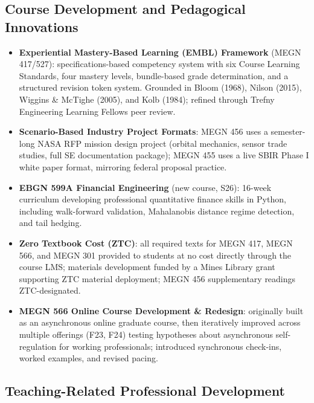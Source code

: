 \documentclass[11pt,letterpaper]{article}
\begin{document}
\subsection{Course Development and Pedagogical Innovations}

\begin{itemize}
  \item \textbf{Experiential Mastery-Based Learning (EMBL) Framework} (MEGN 417/527):
        specifications-based competency system with six Course Learning Standards, four
        mastery levels, bundle-based grade determination, and a structured revision token
        system. Grounded in Bloom (1968), Nilson (2015), Wiggins \& McTighe (2005), and
        Kolb (1984); refined through Trefny Engineering Learning Fellows peer review.

  \item \textbf{Scenario-Based Industry Project Formats}: MEGN 456 uses a semester-long
        NASA RFP mission design project (orbital mechanics, sensor trade studies, full SE
        documentation package); MEGN 455 uses a live SBIR Phase I white paper format,
        mirroring federal proposal practice.

  \item \textbf{EBGN 599A Financial Engineering} (new course, S26): 16-week curriculum
        developing professional quantitative finance skills in Python, including
        walk-forward validation, Mahalanobis distance regime detection, and tail hedging.

  \item \textbf{Zero Textbook Cost (ZTC)}: all required texts for MEGN 417, MEGN 566,
        and MEGN 301 provided to students at no cost directly through the course LMS;
        materials development funded by a Mines Library grant supporting ZTC material
        deployment; MEGN 456 supplementary readings ZTC-designated.

  \item \textbf{MEGN 566 Online Course Development \& Redesign}: originally built as
        an asynchronous online graduate course, then iteratively improved across
        multiple offerings (F23, F24) testing hypotheses about asynchronous
        self-regulation for working professionals; introduced synchronous check-ins,
        worked examples, and revised pacing.
\end{itemize}

\subsection{Teaching-Related Professional Development}
\end{document}
